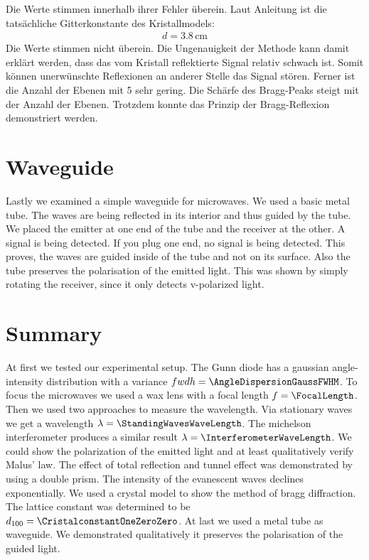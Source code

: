 \documentclass[a4paper,10pt,twocolumn]{article}
\begin{document}
    Die Werte stimmen innerhalb ihrer Fehler überein.
    Laut Anleitung ist die tatsächliche Gitterkonstante des Kristallmodels:
    \begin{align*}
        d = 3.8 \, \mathrm{cm}
    \end{align*}
    Die Werte stimmen nicht überein.
    Die Ungenauigkeit der Methode kann damit erklärt werden, dass das vom Kristall reflektierte Signal
    relativ schwach ist.
    Somit können unerwünschte Reflexionen an anderer Stelle das Signal stören.
    Ferner ist die Anzahl der Ebenen mit 5 sehr gering.
    Die Schärfe des Bragg-Peaks steigt mit der Anzahl der Ebenen.
    Trotzdem konnte das Prinzip der Bragg-Reflexion demonstriert werden.
    
    \section{Waveguide}
    
    Lastly we examined a simple waveguide for microwaves.
    We used a basic metal tube.
    The waves are being reflected in its interior and thus guided by the tube.
    We placed the emitter at one end of the tube and the receiver at the other.
    A signal is being detected.
    If you plug one end, no signal is being detected.
    This proves, the waves are guided inside of the tube and not on its surface.
    Also the tube preserves the polarisation of the emitted light.
    This was shown by simply rotating the receiver, since it only detects v-polarized light.

    \section{Summary}
    
    At first we tested our experimental setup.
    The Gunn diode has a gaussian angle-intensity distribution with a variance $fwdh = \AngleDispersionGaussFWHM$.
    To focus the microwaves we used a wax lens with a focal length $f = \FocalLength$.
    Then we used two approaches to measure the wavelength. 
    Via stationary waves we get a wavelength $\lambda = \StandingWavesWaveLength$.
    The michelson interferometer produces a similar result $\lambda = \InterferometerWaveLength $.
    We could show the polarization of the emitted light and at least qualitatively verify Malus' law. 
    The effect of total reflection and tunnel effect was demonstrated by using a double prism.
    The intensity of the evanescent waves declines exponentially.
    We used a crystal model to show the method of bragg diffraction.
    The lattice constant was determined to be $d_{100} = \CristalconstantOneZeroZero$.
    At last we used a metal tube as waveguide.
    We demonstrated qualitatively it preserves the polarisation of the guided light.
    
\end{document}

